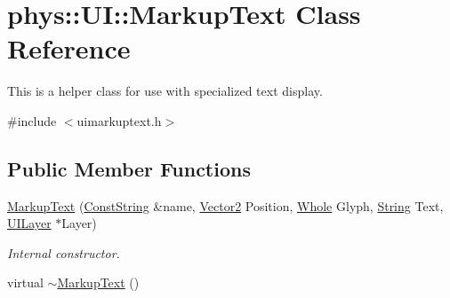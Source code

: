 \hypertarget{classphys_1_1UI_1_1MarkupText}{
\section{phys::UI::MarkupText Class Reference}
\label{d7/d23/classphys_1_1UI_1_1MarkupText}
}


This is a helper class for use with specialized text display.  




{\ttfamily \#include $<$uimarkuptext.h$>$}

\subsection*{Public Member Functions}
\begin{DoxyCompactItemize}
\item 
\hyperlink{classphys_1_1UI_1_1MarkupText_a00e09eb3d72ff569b41f0bc42a396707}{MarkupText} (\hyperlink{namespacephys_a5ce5049f8b4bf88d6413c47b504ebb31}{ConstString} \&name, \hyperlink{classphys_1_1Vector2}{Vector2} Position, \hyperlink{namespacephys_a460f6bc24c8dd347b05e0366ae34f34a}{Whole} Glyph, \hyperlink{namespacephys_aa03900411993de7fbfec4789bc1d392e}{String} Text, \hyperlink{classphys_1_1UILayer}{UILayer} $\ast$Layer)
\begin{DoxyCompactList}\small\item\em Internal constructor. \item\end{DoxyCompactList}\item 
\hypertarget{classphys_1_1UI_1_1MarkupText_a7c5d8033801123c938089ef9ca647f01}{
virtual \hyperlink{classphys_1_1UI_1_1MarkupText_a7c5d8033801123c938089ef9ca647f01}{$\sim$MarkupText} ()}
\label{d7/d23/classphys_1_1UI_1_1MarkupText_a7c5d8033801123c938089ef9ca647f01}


\end{DoxyCompactItemize}
